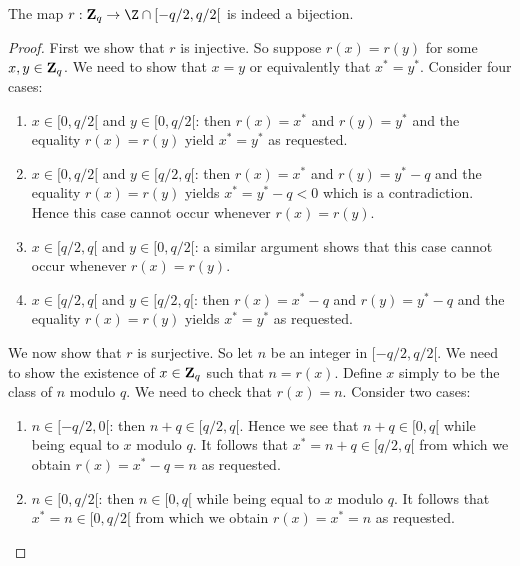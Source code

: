 \documentclass{article}
\newcommand{\zq}{\mbox{${\bf Z}_{q}$}}
\begin{document}
\begin{prop}
  The map $r:\zq\rightarrow\Z\cap[-q/2,q/2[$ is indeed a bijection.
\end{prop}
\begin{proof}
First we show that $r$ is injective. So suppose $r(x)=r(y)$ for some 
$x,y\in\zq$. We need to show that $x=y$ or equivalently that 
$x^{*}=y^{*}$. Consider four cases:
  \begin{enumerate}
    \item $x\in[0,q/2[$ and $y\in[0,q/2[$: then $r(x)=x^{*}$ and $r(y)=y^{*}$
      and the equality $r(x)=r(y)$ yield $x^{*}=y^{*}$ as requested.
    \item $x\in[0,q/2[$ and $y\in[q/2,q[$: then $r(x)=x^{*}$ and 
      $r(y)=y^{*}-q$ and the equality $r(x) = r(y)$ yields $x^{*}=y^{*}-q < 0$
      which is a contradiction. Hence this case cannot occur whenever 
      $r(x)=r(y)$.
    \item $x\in[q/2,q[$ and $y\in[0,q/2[$: a similar argument shows that this
      case cannot occur whenever $r(x)=r(y)$.
    \item $x\in[q/2,q[$ and $y\in[q/2,q[$: then $r(x)=x^{*}-q$ and 
      $r(y)=y^{*}-q$ and the equality $r(x)=r(y)$ yields $x^{*}=y^{*}$ as 
      requested.
  \end{enumerate}
We now show that $r$ is surjective. So let $n$ be an integer in $[-q/2,q/2[$.
  We need to show the existence of $x\in\zq$ such that $n=r(x)$. Define $x$
  simply to be the class of $n$ modulo $q$. We need to check that $r(x)=n$. 
  Consider two cases:
  \begin{enumerate}
    \item $n\in[-q/2,0[$: then $n+q\in[q/2,q[$. Hence we see that $n+q\in[0,q[$
      while being equal to $x$ modulo $q$. It follows that $x^{*}=n+q\in[q/2,q[$
      from which we obtain $r(x) = x^{*} - q = n$ as requested.
    \item $n\in[0,q/2[$: then $n\in[0,q[$ while being equal to $x$ modulo $q$.
      It follows that $x^{*}=n\in[0,q/2[$ from which we obtain $r(x)=x^{*}=n$
      as requested.
  \end{enumerate}
\end{proof}
\end{document}
